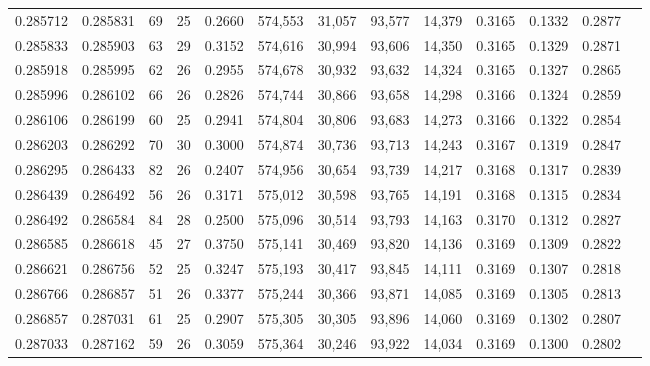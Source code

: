 \begin{tabular}{rrrrrrrrrrrrr}
0.285712 & 0.285831 &  69 &  25 &                                     0.2660 & 574,553 &  31,057 &  93,577 &  14,379 & 0.3165 & 0.1332 & 0.2877 \\
0.285833 & 0.285903 &  63 &  29 &                                     0.3152 & 574,616 &  30,994 &  93,606 &  14,350 & 0.3165 & 0.1329 & 0.2871 \\
0.285918 & 0.285995 &  62 &  26 &                                     0.2955 & 574,678 &  30,932 &  93,632 &  14,324 & 0.3165 & 0.1327 & 0.2865 \\
0.285996 & 0.286102 &  66 &  26 &                                     0.2826 & 574,744 &  30,866 &  93,658 &  14,298 & 0.3166 & 0.1324 & 0.2859 \\
0.286106 & 0.286199 &  60 &  25 &                                     0.2941 & 574,804 &  30,806 &  93,683 &  14,273 & 0.3166 & 0.1322 & 0.2854 \\
0.286203 & 0.286292 &  70 &  30 &                                     0.3000 & 574,874 &  30,736 &  93,713 &  14,243 & 0.3167 & 0.1319 & 0.2847 \\
0.286295 & 0.286433 &  82 &  26 &                                     0.2407 & 574,956 &  30,654 &  93,739 &  14,217 & 0.3168 & 0.1317 & 0.2839 \\
0.286439 & 0.286492 &  56 &  26 &                                     0.3171 & 575,012 &  30,598 &  93,765 &  14,191 & 0.3168 & 0.1315 & 0.2834 \\
0.286492 & 0.286584 &  84 &  28 &                                     0.2500 & 575,096 &  30,514 &  93,793 &  14,163 & 0.3170 & 0.1312 & 0.2827 \\
0.286585 & 0.286618 &  45 &  27 &                                     0.3750 & 575,141 &  30,469 &  93,820 &  14,136 & 0.3169 & 0.1309 & 0.2822 \\
0.286621 & 0.286756 &  52 &  25 &                                     0.3247 & 575,193 &  30,417 &  93,845 &  14,111 & 0.3169 & 0.1307 & 0.2818 \\
0.286766 & 0.286857 &  51 &  26 &                                     0.3377 & 575,244 &  30,366 &  93,871 &  14,085 & 0.3169 & 0.1305 & 0.2813 \\
0.286857 & 0.287031 &  61 &  25 &                                     0.2907 & 575,305 &  30,305 &  93,896 &  14,060 & 0.3169 & 0.1302 & 0.2807 \\
0.287033 & 0.287162 &  59 &  26 &                                     0.3059 & 575,364 &  30,246 &  93,922 &  14,034 & 0.3169 & 0.1300 & 0.2802 \\

\end{tabular}
